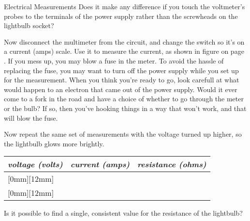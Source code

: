 \begin{lab}{Electrical Measurements}
Does it make any difference if you touch the voltmeter's probes to the terminals of
the power supply rather than the screwheads on the lightbulb socket?

Now disconnect the multimeter from the circuit, and change the switch so it's
on a current (amps) scale. 
Use it to measure the current, as shown in figure
 on page \pageref{fig:ammeteruseschematic}.
If you mess up, you may blow a fuse in the meter. To avoid the hassle of replacing
the fuse, you may want to turn off the power supply while you set up for the
measurement. When you think you're ready to go, look carefull at what would happen
to an electron that came out of the power supply. Would it ever come to a fork
in the road and have a choice of whether to go through the meter or the bulb? If
so, then you've hooking things in a way that won't work, and that will blow the fuse.

Now repeat the same set of measurements with the voltage turned up higher, so the
lightbulb glows more brightly. 

\begin{tabular}{|p{20mm}|p{20mm}|p{20mm}|}
\hline
\emph{voltage (volts)} & \emph{current (amps)} & \emph{resistance (ohms)}\\
\hline
\raisebox{0mm}[0mm][12mm]{} & & \\
\hline
\raisebox{0mm}[0mm][12mm]{} & &\\
\hline
\end{tabular}

Is it possible to find a single, consistent value
for the resistance of the lightbulb?


\end{lab}
